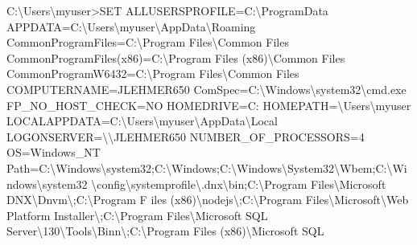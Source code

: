 \documentclass[10pt,american,]{book}
\newenvironment{Shaded}{\begin{snugshade}}{\end{snugshade}}
\newcommand{\KeywordTok}[1]{\textcolor[rgb]{0.13,0.29,0.53}{\textbf{{#1}}}}
\newcommand{\DataTypeTok}[1]{\textcolor[rgb]{0.13,0.29,0.53}{{#1}}}
\newcommand{\OtherTok}[1]{\textcolor[rgb]{0.56,0.35,0.01}{{#1}}}
\newcommand{\NormalTok}[1]{{#1}}
\numberwithin{figure}{chapter}
\renewcommand{\KeywordTok}[1]{{#1}}
\renewcommand{\DataTypeTok}[1]{{#1}}
\renewcommand{\OtherTok}[1]{{#1}}
\renewcommand{\NormalTok}[1]{{#1}}
\begin{document}
\begin{Shaded}
\begin{Highlighting}[]
\KeywordTok{C}\NormalTok{:\textbackslash{}Users\textbackslash{}myuser}\KeywordTok{>}\NormalTok{SET}
\OtherTok{ALLUSERSPROFILE=}\NormalTok{C:\textbackslash{}}\KeywordTok{ProgramData}
\OtherTok{APPDATA=}\NormalTok{C:\textbackslash{}}\KeywordTok{Users}\NormalTok{\textbackslash{}myuser\textbackslash{}AppData\textbackslash{}Roaming}
\OtherTok{CommonProgramFiles=}\NormalTok{C:\textbackslash{}}\KeywordTok{Program} \NormalTok{Files\textbackslash{}Common Files}
\KeywordTok{CommonProgramFiles}\NormalTok{(x86)=}\KeywordTok{C}\NormalTok{:\textbackslash{}Program Files (x86)\textbackslash{}}\KeywordTok{Common} \NormalTok{Files}
\OtherTok{CommonProgramW6432=}\NormalTok{C:\textbackslash{}}\KeywordTok{Program} \NormalTok{Files\textbackslash{}Common Files}
\OtherTok{COMPUTERNAME=}\NormalTok{JLEHMER650}
\OtherTok{ComSpec=}\NormalTok{C:\textbackslash{}}\KeywordTok{Windows}\NormalTok{\textbackslash{}system32\textbackslash{}cmd.exe}
\OtherTok{FP_NO_HOST_CHECK=}\NormalTok{NO}
\OtherTok{HOMEDRIVE=}\NormalTok{C:}
\OtherTok{HOMEPATH=}\NormalTok{\textbackslash{}}\KeywordTok{Users}\NormalTok{\textbackslash{}myuser}
\OtherTok{LOCALAPPDATA=}\NormalTok{C:\textbackslash{}}\KeywordTok{Users}\NormalTok{\textbackslash{}myuser\textbackslash{}AppData\textbackslash{}Local}
\OtherTok{LOGONSERVER=}\DataTypeTok{\textbackslash{}\textbackslash{}}\NormalTok{JLEHMER650}
\OtherTok{NUMBER_OF_PROCESSORS=}\NormalTok{4}
\OtherTok{OS=}\NormalTok{Windows_NT}
\OtherTok{Path=}\NormalTok{C:\textbackslash{}}\KeywordTok{Windows}\NormalTok{\textbackslash{}system32}\KeywordTok{;C}\NormalTok{:\textbackslash{}Windows}\KeywordTok{;C}\NormalTok{:\textbackslash{}Windows\textbackslash{}System32\textbackslash{}Wbem}\KeywordTok{;C}\NormalTok{:\textbackslash{}Windows\textbackslash{}system32}
\NormalTok{\textbackslash{}}\KeywordTok{config}\NormalTok{\textbackslash{}systemprofile\textbackslash{}.dnx\textbackslash{}bin}\KeywordTok{;C}\NormalTok{:\textbackslash{}Program Files\textbackslash{}Microsoft DNX\textbackslash{}Dnvm}\DataTypeTok{\textbackslash{};}\NormalTok{C:\textbackslash{}Program F}
\KeywordTok{iles} \NormalTok{(x86)\textbackslash{}}\KeywordTok{nodejs}\DataTypeTok{\textbackslash{};}\NormalTok{C:\textbackslash{}Program Files\textbackslash{}Microsoft\textbackslash{}Web Platform Installer}\DataTypeTok{\textbackslash{};}\NormalTok{C:\textbackslash{}Program}
 \KeywordTok{Files}\NormalTok{\textbackslash{}Microsoft SQL Server\textbackslash{}130\textbackslash{}Tools\textbackslash{}Binn}\DataTypeTok{\textbackslash{};}\NormalTok{C:\textbackslash{}Program Files (x86)\textbackslash{}}\KeywordTok{Microsoft} \NormalTok{SQL}

\end{Highlighting}
\end{Shaded}
\end{document}
